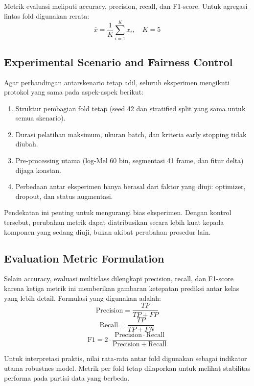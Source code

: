 \documentclass[10pt,a4paper]{jurnalvarian}
\let\LaTeXsubsection\subsection
\def\subsection{\setlength{\leftskip}{0.6cm}\LaTeXsubsection}
\begin{document}
Metrik evaluasi meliputi accuracy, precision, recall, dan F1-score. Untuk agregasi lintas fold digunakan rerata:
\begin{equation}
\bar{x}=\frac{1}{K}\sum_{i=1}^{K}x_i,\quad K=5
\end{equation}

\subsection{Experimental Scenario and Fairness Control}
Agar perbandingan antarskenario tetap adil, seluruh eksperimen mengikuti protokol yang sama pada aspek-aspek berikut:
\begin{enumerate}[leftmargin=1.25cm]
\item Struktur pembagian fold tetap (seed 42 dan stratified split yang sama untuk semua skenario).
\item Durasi pelatihan maksimum, ukuran batch, dan kriteria early stopping tidak diubah.
\item Pre-processing utama (log-Mel 60 bin, segmentasi 41 frame, dan fitur delta) dijaga konstan.
\item Perbedaan antar eksperimen hanya berasal dari faktor yang diuji: optimizer, dropout, dan status augmentasi.
\end{enumerate}

Pendekatan ini penting untuk mengurangi bias eksperimen. Dengan kontrol tersebut, perubahan metrik dapat diatribusikan secara lebih kuat kepada komponen yang sedang diuji, bukan akibat perubahan prosedur lain.

\subsection{Evaluation Metric Formulation}
Selain accuracy, evaluasi multiclass dilengkapi precision, recall, dan F1-score karena ketiga metrik ini memberikan gambaran ketepatan prediksi antar kelas yang lebih detail. Formulasi yang digunakan adalah:
\begin{equation}
\mathrm{Precision}=\frac{TP}{TP+FP}
\end{equation}
\begin{equation}
\mathrm{Recall}=\frac{TP}{TP+FN}
\end{equation}
\begin{equation}
\mathrm{F1}=2\cdot\frac{\mathrm{Precision}\cdot\mathrm{Recall}}{\mathrm{Precision}+\mathrm{Recall}}
\end{equation}

Untuk interpretasi praktis, nilai rata-rata antar fold digunakan sebagai indikator utama robustnes model. Metrik per fold tetap dilaporkan untuk melihat stabilitas performa pada partisi data yang berbeda.
\end{document}
